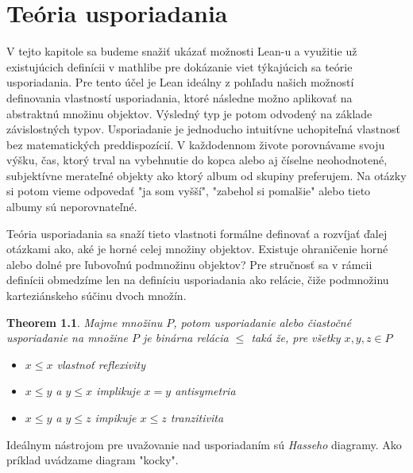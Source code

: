 \documentclass[a4paper,10pt,oneside]{report}%
\newtheorem{theorem}{Theorem}
\begin{document}
\chapter{Teória usporiadania}
    V tejto kapitole sa budeme snažiť ukázať možnosti Lean-u a využitie už existujúcich
definícii v mathlibe pre dokázanie viet týkajúcich sa teórie usporiadania.
    Pre tento účel je Lean ideálny z pohľadu našich možností definovania vlastností
usporiadania, ktoré následne možno aplikovať na abstraktnú množinu objektov.
    Výsledný typ je potom odvodený na základe závislostných typov.
    Usporiadanie je jednoducho intuitívne uchopiteľná vlastnosť bez matematických
preddispozícií.
    V každodennom živote porovnávame svoju výšku, čas, ktorý trval na vybehnutie do kopca
alebo aj číselne neohodnotené, subjektívne merateľné objekty ako ktorý album
od skupiny preferujem.
    Na otázky si potom vieme odpovedať "ja som vyšší", "zabehol si pomalšie" alebo
tieto albumy sú neporovnateľné.

Teória usporiadania sa snaží tieto vlastnoti formálne definovať a rozvíjať ďalej
otázkami ako, aké je horné celej množiny objektov. Existuje ohraničenie horné alebo
dolné pre ľubovoľnú podmnožinu objektov?
    Pre stručnosť sa v rámcii definícii obmedzíme len na definíciu usporiadania
ako relácie, čiže podmnožinu karteziánskeho súčinu dvoch množín.

\begin{theorem}
    Majme množinu $P$, potom usporiadanie alebo čiastočné usporiadanie na množine
    $P$ je binárna relácia $\leq$ taká že, pre všetky $x,y,z \in P$
    \begin{itemize}
        \item $x \leq x$ vlastnoť reflexivity
        \item $x \leq y$ a $y \leq x$ implikuje $x = y$ antisymetria
        \item $x \leq y$ a $y \leq z$ impikuje $x \leq z$ tranzitivita
    \end{itemize}
\end{theorem}

    Ideálnym nástrojom pre uvažovanie nad usporiadaním sú \emph{Hasseho} diagramy.
    Ako príklad uvádzame diagram "kocky".
\end{document}
